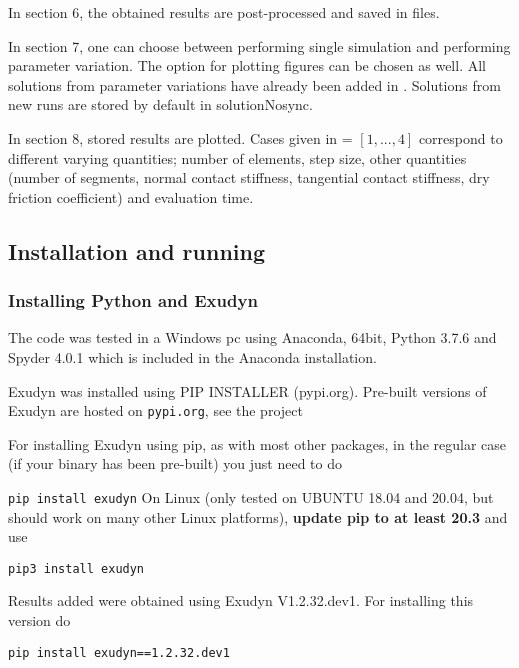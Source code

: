 \item{In section 6, the obtained results are post-processed and saved in files.}
\item{In section 7, one can choose between performing single simulation and performing parameter variation.
The option for plotting figures can be chosen as well. All solutions from parameter variations have already been added in . Solutions from new runs are stored by default in solutionNosync.} %
\item{In section 8, stored results are plotted. Cases given in  = $[1,..., 4]$ correspond to different varying quantities; number of elements, step size, other quantities (number of segments, normal contact stiffness, tangential contact stiffness, dry friction coefficient) and evaluation time.}
%

\ei
\subsection{Installation and running}
\subsubsection{Installing Python and Exudyn}
The code was tested in a Windows pc using Anaconda, 64bit, Python 3.7.6 and Spyder 4.0.1 which is included in the Anaconda installation.

Exudyn was installed using PIP INSTALLER (pypi.org).
Pre-built versions of Exudyn are hosted on \texttt{pypi.org}, see the project
\bi
 \item {}
\ei
For installing Exudyn using pip, as with most other packages, in the regular case (if your binary has been pre-built) you just need to do
\bi
  \item[] \texttt{pip install exudyn}
\ei
On Linux (only tested on UBUNTU 18.04 and 20.04, but should work on many other Linux platforms), {\bf update pip to at least 20.3} and use 
\bi
  \item[] \texttt{pip3 install exudyn}
\ei

Results added  
were obtained using Exudyn V1.2.32.dev1. For installing this version do
\bi
  \item[] \texttt{pip install exudyn==1.2.32.dev1}
\ei
             
